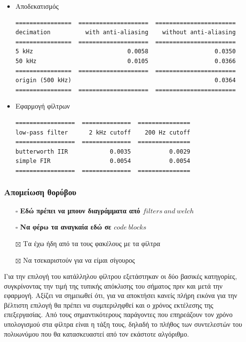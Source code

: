 \documentclass[breaklines=true, 12pt]{article}
\begin{document}
\begin{enumerate}
\begin{itemize}
\begin{itemize}
\item Αποδεκατισμός
\begin{verbatim}
================  ====================  =======================
decimation          with anti-aliasing    without anti-aliasing
================  ====================  =======================
5 kHz                           0.0058                   0.0350
50 kHz                          0.0105                   0.0366
================  ====================  =======================
origin (500 kHz)                                         0.0364
================  ====================  =======================
\end{verbatim}
\end{itemize}

\begin{itemize}
\item Εφαρμογή φίλτρων
\begin{verbatim}
=================  ==============  ===============
low-pass filter      2 kHz cutoff    200 Hz cutoff
=================  ==============  ===============
butterworth IIR            0.0035           0.0029
simple FIR                 0.0054           0.0054
=================  ==============  ===============
\end{verbatim}
\end{itemize}
\end{itemize}
\end{enumerate}
\subsubsection{Απομείωση θορύβου}
\label{sec:orge247109}
\begin{itemize}
\item[{$\square$}] \textbf{Εδώ πρέπει να μπουν διαγράμματα από \(filters\ and\ welch\)}
\item[{$\square$}] \textbf{Να φέρω τα αναγκαία εδώ σε \(code\ blocks\)}
\item[{$\boxtimes$}] Τα έχω ήδη από τα τους φακέλους με τα φίλτρα
\item[{$\boxtimes$}] Να τσεκαριστούν για να είμαι σίγουρος
\end{itemize}

Για την επιλογή του κατάλληλου φίλτρου εξετάστηκαν οι δύο βασικές
κατηγορίες, συγκρίνοντας την τιμή της τυπικής απόκλισης του σήματος πριν
και μετά την εφαρμογή. Αξίζει να σημειωθεί ότι, για να αποκτήσει κανείς
πλήρη εικόνα για την βέλτιστη επιλογή θα πρέπει να συμπεριληφθεί και ο
χρόνος εκτέλεσης της επεξεργασίας. Από τους σημαντικότερους παράγοντες
που επηρεάζουν τον χρόνο υπολογισμού στα φίλτρα είναι η τάξη τους, δηλαδή
το πλήθος των συντελεστών του πολυωνύμου που θα κατασκευαστεί από τον
εκάστοτε αλγόριθμο.
\end{document}
